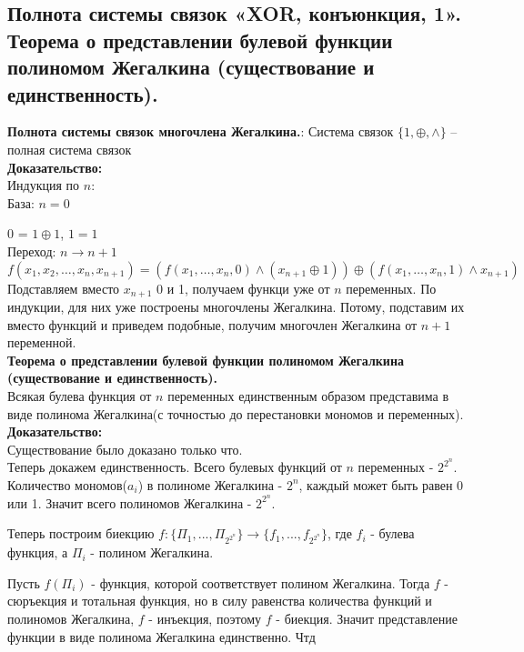 \subsection{Полнота системы связок «XOR, конъюнкция, 1». Теорема о представлении булевой функции полиномом Жегалкина (существование и единственность).}
\textbf{Полнота системы связок многочлена Жегалкина.}: Система связок $\{1, \oplus, \wedge\}$ -- полная система связок\\

\noindent \textbf{Доказательство:}\\

Индукция по $n$:\\

База: $n = 0$ 

0 = $1 \oplus 1$, $1 = 1$\\

Переход: $n \rightarrow n + 1$\\

$f(x_1,x_2,\ldots,x_n,x_{n+1}) = (f(x_1,\ldots,x_n,0) \wedge (x_{n+1} \oplus 1)) \oplus (f(x_1, \ldots, x_n, 1) \wedge x_{n+1})$\\

Подставляем вместо $x_{n+1}$ 0 и 1, получаем функци уже от $n$ переменных. По индукции, для них уже построены многочлены Жегалкина. Потому, подставим их вместо функций и приведем подобные, получим многочлен Жегалкина от $n + 1$ переменной.\\

\textbf{Теорема о представлении булевой функции полиномом Жегалкина (существование и единственность).}\\

Всякая булева функция от $n$ переменных единственным образом представима в виде полинома Жегалкина(с точностью до перестановки мономов и переменных).\\

\noindent \textbf{Доказательство:}\\

Существование было доказано только что.\\

Теперь докажем единственность. Всего булевых функций от $n$ переменных - $2^{2^n}$. Количество мономов($a_i$) в полиноме Жегалкина - $2^n$, каждый
может быть равен 0 или 1. Значит всего полиномов Жегалкина - $2^{2^n}$.

Теперь построим биекцию $f : \{\Pi_1, ..., \Pi_{2^{2^n}} \} \to \{f_1, ..., f_{2^{2^n}}\}$, где $f_i$ - булева функция, а $\Pi_i$ - полином Жегалкина.

Пусть $f(\Pi_i)$ - функция, которой соответствует полином Жегалкина. Тогда $f$ - сюръекция и тотальная функция, но в силу равенства количества
функций и полиномов Жегалкина, $f$ - инъекция, поэтому $f$ - биекция. Значит представление функции в виде полинома Жегалкина единственно. Чтд
